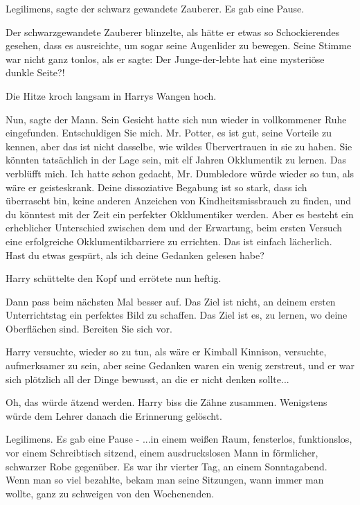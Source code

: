 \glqq Legilimens\grqq{}, sagte der schwarz gewandete Zauberer. Es gab eine
Pause.

Der schwarzgewandete Zauberer blinzelte, als hätte er etwas so Schockierendes
gesehen, dass es ausreichte, um sogar seine Augenlider zu bewegen. Seine Stimme
war nicht ganz tonlos, als er sagte: \glqq Der Junge-der-lebte hat eine
mysteriöse dunkle Seite?!\grqq{}

Die Hitze kroch langsam in Harrys Wangen hoch.

\glqq Nun\grqq{}, sagte der Mann. Sein Gesicht hatte sich nun wieder in
vollkommener Ruhe eingefunden. \glqq Entschuldigen Sie mich. Mr. Potter, es ist
gut, seine Vorteile zu kennen, aber das ist nicht dasselbe, wie wildes
Übervertrauen in sie zu haben. Sie könnten tatsächlich in der Lage sein, mit elf
Jahren Okklumentik zu lernen. Das verblüfft mich. Ich hatte schon gedacht, Mr.
Dumbledore würde wieder so tun, als wäre er geisteskrank. Deine dissoziative
Begabung ist so stark, dass ich überrascht bin, keine anderen Anzeichen von
Kindheitsmissbrauch zu finden, und du könntest mit der Zeit ein perfekter
Okklumentiker werden. Aber es besteht ein erheblicher Unterschied zwischen dem
und der Erwartung, beim ersten Versuch eine erfolgreiche Okklumentikbarriere zu
errichten. Das ist einfach lächerlich. Hast du etwas gespürt, als ich deine
Gedanken gelesen habe?\grqq{}

Harry schüttelte den Kopf und errötete nun heftig.

\glqq Dann pass beim nächsten Mal besser auf. Das Ziel ist nicht, an deinem
ersten Unterrichtstag ein perfektes Bild zu schaffen. Das Ziel ist es, zu
lernen, wo deine Oberflächen sind. Bereiten Sie sich vor.\grqq{}

Harry versuchte, wieder so zu tun, als wäre er Kimball Kinnison, versuchte,
aufmerksamer zu sein, aber seine Gedanken waren ein wenig zerstreut, und er war
sich plötzlich all der Dinge bewusst, an die er nicht denken sollte...

Oh, das würde ätzend werden. Harry biss die Zähne zusammen. Wenigstens würde dem
Lehrer danach die Erinnerung gelöscht.

\glqq Legilimens.\grqq{} Es gab eine Pause - ...in einem weißen Raum,
fensterlos, funktionslos, vor einem Schreibtisch sitzend, einem ausdruckslosen
Mann in förmlicher, schwarzer Robe gegenüber. Es war ihr vierter Tag, an einem
Sonntagabend. Wenn man so viel bezahlte, bekam man seine Sitzungen, wann immer
man wollte, ganz zu schweigen von den Wochenenden.

